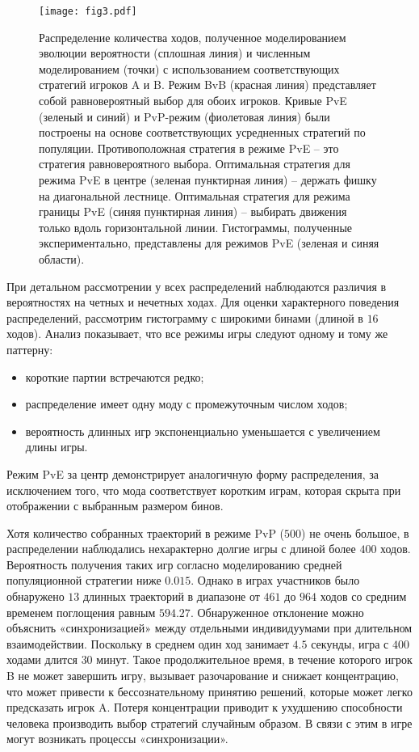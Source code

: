 \begin{figure*}[t]
    \begin{center}
    \texttt{[image: fig3.pdf]}
    \caption{
        Распределение количества ходов, полученное моделированием эволюции вероятности (сплошная линия) и численным моделированием (точки) 
        с использованием соответствующих стратегий игроков A и B. 
        Режим BvB (красная линия) представляет собой равновероятный выбор для обоих игроков. Кривые PvE (зеленый и синий) и PvP-режим (фиолетовая линия) 
        были построены на основе соответствующих усредненных стратегий по популяции. Противоположная стратегия в режиме PvE -- это стратегия равновероятного выбора. 
        Оптимальная стратегия для режима PvE в центре (зеленая пунктирная линия) -- держать фишку на диагональной лестнице. Оптимальная стратегия для режима границы PvE 
        (синяя пунктирная линия) -- выбирать движения только вдоль горизонтальной линии. Гистограммы, полученные экспериментально, представлены для режимов PvE 
        (зеленая и синяя области).
    }  
    \label{fig:distribution_time}
    \end{center}
\end{figure*}

При детальном рассмотрении у всех распределений наблюдаются различия в вероятностях на четных и нечетных ходах. 
Для оценки характерного поведения распределений, рассмотрим гистограмму с широкими бинами (длиной в $16$ ходов). 
Анализ показывает, что все режимы игры следуют одному и тому же паттерну:
\begin{itemize}
\item короткие партии встречаются редко;
\item распределение имеет одну моду с промежуточным числом ходов;
\item вероятность длинных игр экспоненциально уменьшается с увеличением длины игры.
\end{itemize}

Режим PvE за центр демонстрирует аналогичную форму распределения, за исключением того, что мода соответствует коротким играм, 
которая скрыта при отображении с выбранным размером бинов.

Хотя количество собранных траекторий в режиме PvP ($500$) не очень большое, в распределении наблюдались нехарактерно долгие игры с длиной более $400$ ходов. 
Вероятность получения таких игр согласно моделированию средней популяционной стратегии ниже $0.015$. 
Однако в играх участников было обнаружено $13$ длинных траекторий в диапазоне от $461$ до $964$ ходов со средним временем поглощения равным $594.27$. 
Обнаруженное отклонение можно объяснить «синхронизацией» между отдельными индивидуумами при длительном взаимодействии. 
Поскольку в среднем один ход занимает $4.5$ секунды, игра с $400$ ходами длится $30$ минут. 
Такое продолжительное время, в течение которого игрок B не может завершить игру, вызывает разочарование и снижает концентрацию, 
что может привести к бессознательному принятию решений, которые может легко предсказать игрок A. 
Потеря концентрации приводит к ухудшению способности человека производить выбор стратегий случайным образом. 
В связи с этим в игре могут возникать процессы «синхронизации».

